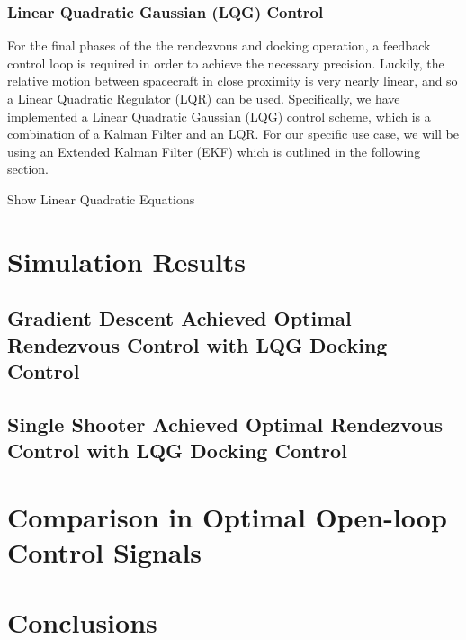 \documentclass[conf]{new-aiaa}
\begin{document}
\subsubsection{Linear Quadratic Gaussian (LQG) Control}
For the final phases of the the rendezvous and docking operation, a feedback control loop is required in order to achieve the necessary precision.  Luckily, the relative motion between spacecraft in close proximity is very nearly linear, and so a Linear Quadratic Regulator (LQR) can be used.  Specifically, we have implemented a Linear Quadratic Gaussian (LQG) control scheme, which is a combination of a Kalman Filter and an LQR.  For our specific use case, we will be using an Extended Kalman Filter (EKF) which is outlined in the following section.

{\color{red} Show Linear Quadratic Equations}






\section{Simulation Results}
\subsection{Gradient Descent Achieved Optimal Rendezvous Control with LQG Docking Control}

\subsection{Single Shooter Achieved Optimal Rendezvous Control with LQG Docking Control}



\section{Comparison in Optimal Open-loop Control Signals}





\section{Conclusions}





			
\end{document}
